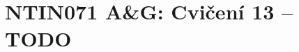 \documentclass[a4paper,12pt]{amsart}
\begin{document}
\thispagestyle{empty}

\section*{NTIN071 A\&G: Cvičení 13 -- TODO}


\medskip
\end{document}

